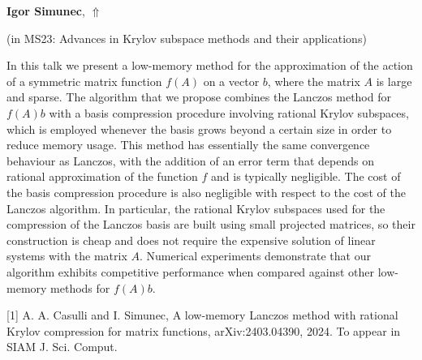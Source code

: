 \documentclass[ILAS2025-program.tex]{subfiles}
\begin{document}
     \hypertarget{down0394}{}\begin{ilasabstract}
    
    \textbf{Igor Simunec},  \hfill \hyperlink{up0394}{$\Uparrow$}
    
    (in {\color{mstitle}MS23: Advances in Krylov subspace methods and their applications})
        
        \mtskip
    In this talk we present a low-memory method for the approximation of the action of a symmetric matrix function $f(A)$ on a vector $b$, where the matrix $A$ is large and sparse. 
The algorithm that we propose combines the Lanczos method for $f(A) b$ with a basis compression procedure involving rational Krylov subspaces, which is employed whenever the basis grows beyond a certain size in order to reduce memory usage. 
This method has essentially the same convergence behaviour as Lanczos, with the addition of an error term that depends on rational approximation of the function $f$ and is typically negligible. 
The cost of the basis compression procedure is also negligible with respect to the cost of the Lanczos algorithm. In particular, the rational Krylov subspaces used for the compression of the Lanczos basis are built using small projected matrices, so their construction is cheap and does not require the expensive solution of linear systems with the matrix $A$. 
Numerical experiments demonstrate that our algorithm exhibits competitive performance when compared against other low-memory methods for $f(A) b$.

[1] A. A. Casulli and I. Simunec, A low-memory Lanczos method with rational Krylov compression for matrix functions, arXiv:2403.04390, 2024. To appear in SIAM J. Sci. Comput.
\end{ilasabstract}
\end{document}
